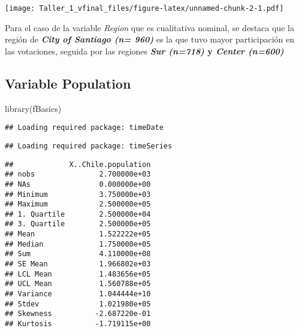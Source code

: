 \documentclass[
]{article}
\newenvironment{Shaded}{\begin{snugshade}}{\end{snugshade}}
\newcommand{\CommentTok}[1]{\textcolor[rgb]{0.56,0.35,0.01}{\textit{#1}}}
\newcommand{\FunctionTok}[1]{\textcolor[rgb]{0.00,0.00,0.00}{#1}}
\newcommand{\NormalTok}[1]{#1}
\newcommand{\SpecialCharTok}[1]{\textcolor[rgb]{0.00,0.00,0.00}{#1}}
\begin{document}
\texttt{[image: Taller\_1\_vfinal\_files/figure-latex/unnamed-chunk-2-1.pdf]}

Para el caso de la variable \emph{Region} que es cualitativa nominal, se
destaca que la región de \textbf{\emph{City of Santiago (n= 960)}} es la
que tuvo mayor participación en las votaciones, seguida por las regiones
\textbf{\emph{Sur (n=718)} y \emph{Center (n=600)}}

\hypertarget{variable-population}{%
\subsection{\texorpdfstring{Variable
\textbf{Population}}{Variable Population}}\label{variable-population}}

\begin{Shaded}
\begin{Highlighting}[]
\FunctionTok{library}\NormalTok{(fBasics)}
\end{Highlighting}
\end{Shaded}

\begin{verbatim}
## Loading required package: timeDate
\end{verbatim}

\begin{verbatim}
## Loading required package: timeSeries
\end{verbatim}

\begin{Shaded}
\end{Shaded}

\begin{verbatim}
##             X..Chile.population
## nobs               2.700000e+03
## NAs                0.000000e+00
## Minimum            3.750000e+03
## Maximum            2.500000e+05
## 1. Quartile        2.500000e+04
## 3. Quartile        2.500000e+05
## Mean               1.522222e+05
## Median             1.750000e+05
## Sum                4.110000e+08
## SE Mean            1.966802e+03
## LCL Mean           1.483656e+05
## UCL Mean           1.560788e+05
## Variance           1.044444e+10
## Stdev              1.021980e+05
## Skewness          -2.687220e-01
## Kurtosis          -1.719115e+00
\end{verbatim}

\begin{Shaded}
\end{Shaded}
\end{document}
